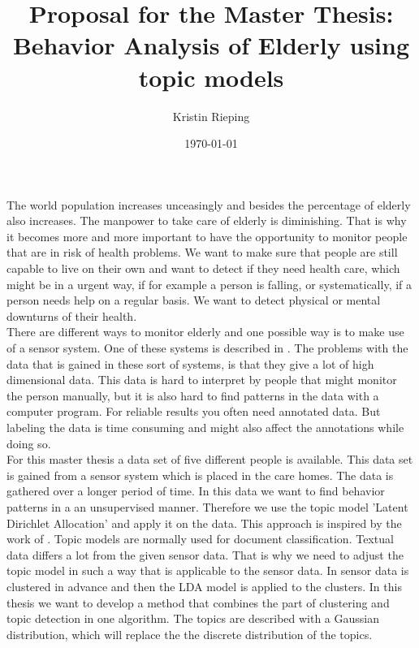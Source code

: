 \documentclass[a4paper,10pt]{article}
\title{Proposal for the Master Thesis: Behavior Analysis of Elderly using topic models}
\author{Kristin Rieping}
\date{\today}
\begin{document}
\maketitle
The world population increases unceasingly and besides the percentage of elderly also increases. The manpower to take care of elderly is diminishing. That is why it becomes more and more important to have the opportunity to monitor people that are in risk of health problems. We want to make sure that people are still capable to live on their own and want to detect if they need health care, which might be in a urgent way, if for example a person is falling, or systematically, if a person needs help on a regular basis. We want to detect physical or mental downturns of their health.\\
There are different ways to monitor elderly and one possible way is to make use of a sensor system.
One of these systems is described in \cite{van2010activity}. The problems with the data that is gained in these sort of systems, is that they give a lot of high dimensional data. This data is hard to interpret by people that might monitor the person manually, but it is also hard to find patterns in the data with a computer program. For reliable results you often need annotated data. But labeling the data is time consuming and might also affect the annotations while doing so.\\

For this master thesis a data set of five different people is available. This data set is gained from a sensor system which is placed in the care homes. The data is gathered over a longer period of time. In this data we want to find behavior patterns in a an unsupervised manner. Therefore we use the topic model 'Latent Dirichlet Allocation' \cite{blei2003latent} and apply it on the data. This approach is inspired by the work of \cite{farrahi2008daily}.
Topic models are normally used for document classification. Textual data differs a lot from the given sensor data. That is why we need to adjust the topic model in such a way that is applicable to the sensor data. In \cite{Casale:2009} sensor data is clustered in advance and then the LDA model is applied to the clusters.
In this thesis we want to develop a method that combines the part of clustering and topic detection in one algorithm. The topics are described with a Gaussian distribution, which will replace the the discrete distribution of the topics.

\appendix
{}

\end{document}
